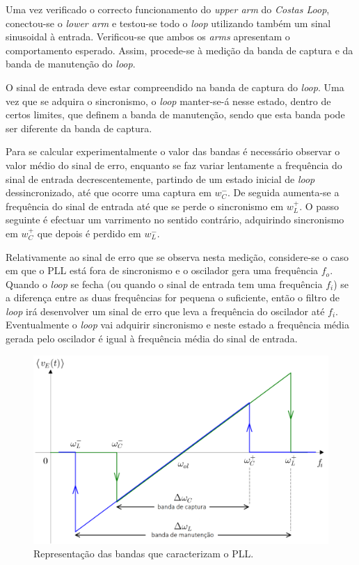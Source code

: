 \documentclass[11pt]{article}
\numberwithin{equation}{section}
\begin{document}
Uma vez verificado o correcto funcionamento do \textit{upper arm} do \textit{Costas Loop}, conectou-se o \textit{lower arm} e testou-se todo o \textit{loop} utilizando também um sinal sinusoidal à entrada. Verificou-se que ambos os \textit{arms} apresentam o comportamento esperado. Assim, procede-se à medição da banda de captura e da banda de manutenção do \textit{loop}.

O sinal de entrada deve estar compreendido na banda de captura do \textit{loop}. Uma vez que se adquira o sincronismo, o \textit{loop} manter-se-á nesse estado, dentro de certos limites, que definem a banda de manutenção, sendo que esta banda pode ser diferente da banda de captura. 

Para se calcular experimentalmente o valor das bandas é necessário observar o valor médio do sinal de erro, enquanto se faz variar lentamente a frequência do sinal de entrada decrescentemente, partindo de um estado inicial de \textit{loop} dessincronizado, até que ocorre uma captura em $w_{C}^{-}$. De seguida aumenta-se a frequência do sinal de entrada até que se perde o sincronismo em $w_{L}^{+}$. O passo seguinte é efectuar um varrimento no sentido contrário, adquirindo sincronismo em $w_{C}^{+}$ que depois é perdido em $w_{L}^{-}$.

Relativamente ao sinal de erro que se observa nesta medição, considere-se o caso em que o PLL está fora de sincronismo e o oscilador gera uma frequência $f_o$. Quando o \textit{loop} se fecha (ou quando o sinal de entrada tem uma frequência $f_i$) se a diferença entre as duas frequências for pequena o suficiente, então o filtro de  \textit{loop} irá desenvolver um sinal de erro que leva a frequência do oscilador até $f_i$. Eventualmente o \textit{loop} vai adquirir sincronismo e neste estado a frequência média gerada pelo oscilador é igual à frequência média do sinal de entrada.

\begin{figure}[H]
	\centering
	\includegraphics[keepaspectratio=true, scale=0.25]{teoricas/malhas}
	\caption{Representação das bandas que caracterizam o PLL.}
	\vspace{-0.8em}
\end{figure} 
\end{document}
